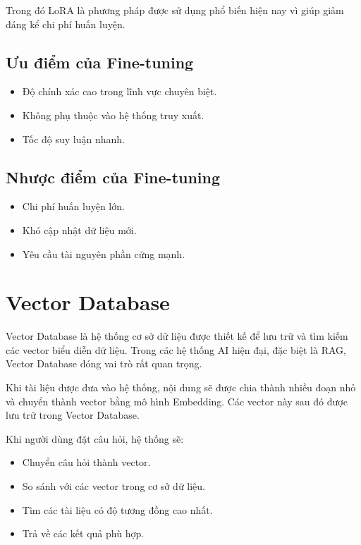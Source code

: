 \documentclass[12pt,a4paper]{report}
\begin{document}
	Trong đó LoRA là phương pháp được sử dụng phổ biến hiện nay vì giúp giảm đáng kể chi phí huấn luyện.
	
	\subsection{Ưu điểm của Fine-tuning}
	
	\begin{itemize}
		\item Độ chính xác cao trong lĩnh vực chuyên biệt.
		\item Không phụ thuộc vào hệ thống truy xuất.
		\item Tốc độ suy luận nhanh.
	\end{itemize}
	
	\subsection{Nhược điểm của Fine-tuning}
	
	\begin{itemize}
		\item Chi phí huấn luyện lớn.
		\item Khó cập nhật dữ liệu mới.
		\item Yêu cầu tài nguyên phần cứng mạnh.
	\end{itemize}
	
	\section{Vector Database}
	
	Vector Database là hệ thống cơ sở dữ liệu được thiết kế để lưu trữ và tìm kiếm các vector biểu diễn dữ liệu. Trong các hệ thống AI hiện đại, đặc biệt là RAG, Vector Database đóng vai trò rất quan trọng.
	
	Khi tài liệu được đưa vào hệ thống, nội dung sẽ được chia thành nhiều đoạn nhỏ và chuyển thành vector bằng mô hình Embedding. Các vector này sau đó được lưu trữ trong Vector Database.
	
	Khi người dùng đặt câu hỏi, hệ thống sẽ:
	
	\begin{itemize}
		\item Chuyển câu hỏi thành vector.
		\item So sánh với các vector trong cơ sở dữ liệu.
		\item Tìm các tài liệu có độ tương đồng cao nhất.
		\item Trả về các kết quả phù hợp.
	\end{itemize}
	
\end{document}
